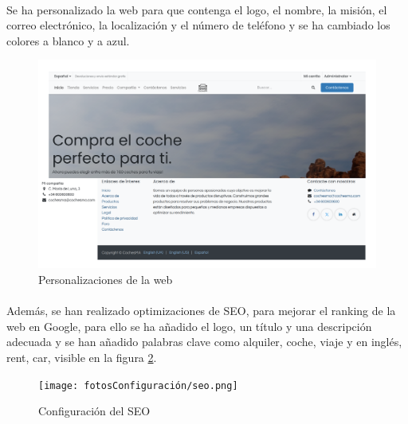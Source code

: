 \paragraph{}
Se ha personalizado la web para que contenga el logo, el nombre, la misión, el correo electrónico, la localización y el número de teléfono y se ha cambiado los colores a blanco y a azul.
\newpage
\begin{figure}[h]
    \centering
    \includegraphics[width=1\linewidth]{fotosConfiguración/personalización.png}
    \caption{Personalizaciones de la web}
    \label{fig:enter-label}
\end{figure}
\paragraph{}
Además, se han realizado optimizaciones de SEO, para mejorar el ranking de la web en Google, para ello se ha añadido el logo, un título y una descripción adecuada y se han añadido palabras clave como alquiler, coche, viaje y en inglés, rent, car, visible en la figura \ref{fig:seo}.
\newpage
\begin{figure}[h]
    \centering
    \texttt{[image: fotosConfiguración/seo.png]}
    \caption{Configuración del SEO}
    \label{fig:seo}
\end{figure}

